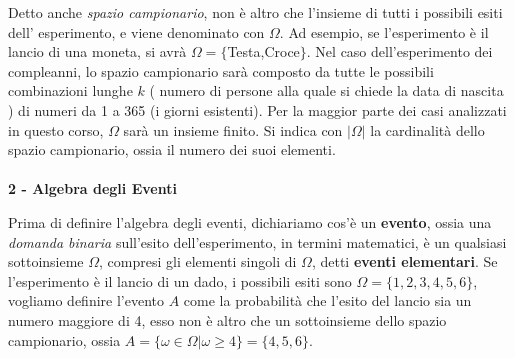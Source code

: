 \documentclass[12pt, letterpaper]{article}
\begin{document}
Detto anche \textit{spazio campionario}, non è altro che l'insieme di tutti i possibili esiti dell'
esperimento, e viene denominato con \(\Omega\). Ad esempio, se l'esperimento è il lancio di una moneta,
si avrà \(\Omega=\{\)Testa,Croce\(\}\). Nel caso dell'esperimento dei compleanni, lo spazio campionario 
sarà composto da tutte le possibili combinazioni lunghe \(k\) ( numero di persone alla quale si chiede 
la data di nascita ) di numeri da 1 a 365 (i giorni esistenti). Per la maggior parte dei casi analizzati 
in questo corso, \(\Omega\) sarà un insieme finito. Si indica con \(|\Omega|\) la cardinalità dello 
spazio campionario, ossia il numero dei suoi elementi.
\\\hphantom{.}\\\textbf{2 - Algebra degli Eventi}

Prima di definire l'algebra degli eventi, dichiariamo cos'è un \textbf{evento}, ossia una \textit{domanda
binaria} sull'esito dell'esperimento, in termini matematici, è un qualsiasi sottoinsieme \(\Omega\), compresi
gli elementi singoli di \(\Omega\), detti \textbf{eventi elementari}. Se l'esperimento è il lancio di un dado,
i possibili esiti sono \(\Omega=\{1,2,3,4,5,6\}\), vogliamo definire l'evento \(A\) come la probabilità
che l'esito del lancio sia un numero maggiore di 4, esso non è altro che un sottoinsieme dello spazio campionario,
ossia \(A=\{\omega \in \Omega | \omega \ge 4 \}=\{4,5,6\}\). 
\end{document}
